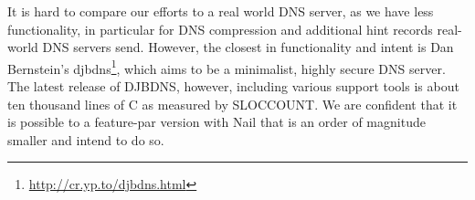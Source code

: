 It is hard to compare our efforts to a real world DNS server, as we have less functionality, in
particular for DNS compression and additional hint records real-world DNS servers send. 
However, the closest in functionality and intent is Dan Bernstein's djbdns\footnote{\url{http://cr.yp.to/djbdns.html}}, which aims
to be a minimalist, highly secure DNS server. The latest release of DJBDNS, however, including
various support tools is about ten thousand lines of C as measured by SLOCCOUNT. We are confident
that it is possible to a feature-par version with Nail that is an order of magnitude smaller and
intend to do so.


